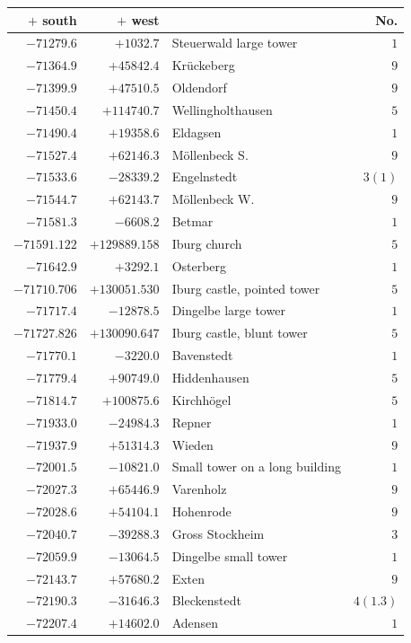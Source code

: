 \begin{center}\begingroup\fontsize{8}{9}\selectfont
\setlength{\tabcolsep}{4pt}
\begin{tabular}{r|r|p{170pt}|r}\hline
\(+\) south&\(+\) west&&No.\\\hline
\(-71279.6\)&\(+1032.7\)&Steuerwald large tower&\(1\)\\
\(-71364.9\)&\(+45842.4\)&Krückeberg&\(9\)\\
\(-71399.9\)&\(+47510.5\)&Oldendorf&\(9\)\\
\(-71450.4\)&\(+114740.7\)&Wellingholthausen&\(5\)\\
\(-71490.4\)&\(+19358.6\)&Eldagsen&\(1\)\\
\(-71527.4\)&\(+62146.3\)&Möllenbeck S.&\(9\)\\
\(-71533.6\)&\(-28339.2\)&Engelnstedt&\(3 (1)\)\\
\(-71544.7\)&\(+62143.7\)&Möllenbeck W.&\(9\)\\
\(-71581.3\)&\(-6608.2\)&Betmar&\(1\)\\
\(-71591.122\)&\(+129889.158\)&Iburg church&\(5\)\\
\(-71642.9\)&\(+3292.1\)&Osterberg&\(1\)\\
\(-71710.706\)&\(+130051.530\)&Iburg castle, pointed tower&\(5\)\\
\(-71717.4\)&\(-12878.5\)&Dingelbe large tower&\(1\)\\
\(-71727.826\)&\(+130090.647\)&Iburg castle, blunt tower&\(5\)\\
\(-71770.1\)&\(-3220.0\)&Bavenstedt&\(1\)\\
\(-71779.4\)&\(+90749.0\)&Hiddenhausen&\(5\)\\
\(-71814.7\)&\(+100875.6\)&Kirchhögel&\(5\)\\
\(-71933.0\)&\(-24984.3\)&Repner&\(1\)\\
\(-71937.9\)&\(+51314.3\)&Wieden&\(9\)\\
\(-72001.5\)&\(-10821.0\)&Small tower on a long building&\(1\)\\
\(-72027.3\)&\(+65446.9\)&Varenholz&\(9\)\\
\(-72028.6\)&\(+54104.1\)&Hohenrode&\(9\)\\
\(-72040.7\)&\(-39288.3\)&Gross Stockheim&\(3\)\\
\(-72059.9\)&\(-13064.5\)&Dingelbe small tower&\(1\)\\
\(-72143.7\)&\(+57680.2\)&Exten&\(9\)\\
\(-72190.3\)&\(-31646.3\)&Bleckenstedt&\(4(1.3)\)\\
\(-72207.4\)&\(+14602.0\)&Adensen&\(1\)\\

\end{tabular}
\end{center}
